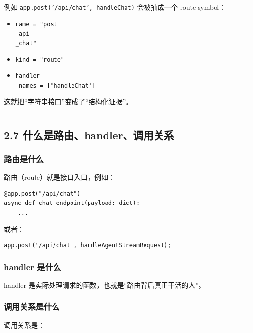 \documentclass[UTF8,12pt,openany]{ctexbook}
\begin{document}
例如 \texttt{app.post('/api/chat', handleChat)} 会被抽成一个 route symbol：\par

\begin{itemize}
\item \texttt{name = "post\\_api\\_chat"}
\item \texttt{kind = "route"}
\item \texttt{handler\\_names = ["handleChat"]}
\end{itemize}

这就把“字符串接口”变成了“结构化证据”。\par

\hrule

\subsection{2.7 什么是路由、handler、调用关系}

\subsubsection{路由是什么}

路由（route）就是接口入口，例如：\par

\begin{lstlisting}
@app.post("/api/chat")
async def chat_endpoint(payload: dict):
    ...
\end{lstlisting}

或者：\par

\begin{lstlisting}
app.post('/api/chat', handleAgentStreamRequest);
\end{lstlisting}

\subsubsection{handler 是什么}

handler 是实际处理请求的函数，也就是“路由背后真正干活的人”。\par

\subsubsection{调用关系是什么}

调用关系是：\par
\end{document}
